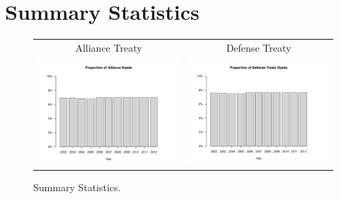 \documentclass[reqno,onecolumn,letterpaper,12pt]{article}
\begin{document}
\newpage
\singlespacing




\newpage
\doublespacing
\appendix
\section{Summary Statistics}
\begin{figure}[htp]
\centering
\begin{tabular}{c@{\hskip -.4cm}c}
Alliance Treaty &
Defense Treaty\\
\includegraphics[height=.2\textheight, clip=true, trim=0cm 1cm 0cm 1.6cm]{draft_figures/descriptive_plots/alliance.pdf}    &
\includegraphics[height=.2\textheight, clip=true, trim=.5cm 1cm 0cm 1.6cm]{draft_figures/descriptive_plots/defense.pdf}   \\
\end{tabular}
\caption{\label{fig:effectPlots4} Summary Statistics.}
\end{figure}
\end{document}
